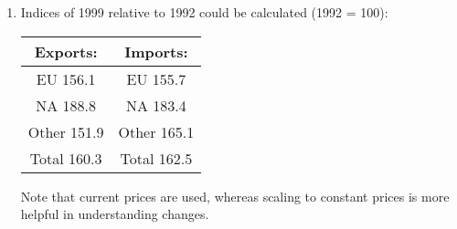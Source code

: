 \documentclass[a4paper,12pt]{article}
\begin{document}
\begin{enumerate}
\item  Indices of 1999 relative to 1992 could be calculated (1992 = 100): 
 \begin{center}
\begin{tabular}{|c|c|}
 Exports: &  Imports:  \\ \hline 
EU 156.1 &     EU 155.7 \\   
NA 188.8 &      NA 183.4 \\  
Other 151.9 &     Other 165.1 \\
   Total 160.3 &     Total 162.5 \\
\end{tabular}
\end{center}
 
 
 
Note that current prices are used, whereas scaling to constant prices is more helpful in understanding changes. 
\end{enumerate}
\end{document}

